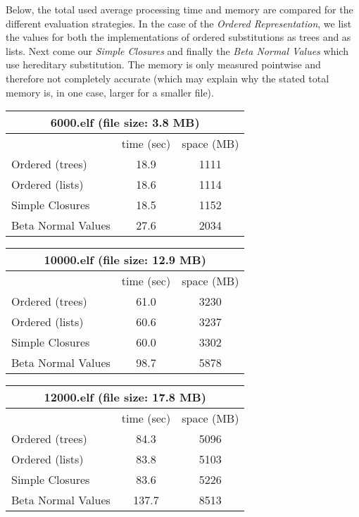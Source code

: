 \documentclass[12pt, a4paper, titlepage]{article}
\begin{document}
Below, the total used average processing time and memory are compared for the different evaluation strategies. In the case of the \emph{Ordered Representation}, we list the values for both the implementations of ordered substitutions as trees and as lists. Next come our \emph{Simple Closures} and finally the \emph{Beta Normal Values} which use hereditary substitution. The memory is only measured pointwise and therefore not completely accurate (which may explain why the stated total memory is, in one case, larger for a smaller file).

\begin{center}

\begin{tabular}{| l || c | c |}
\multicolumn{3}{c}{\textsf{6000.elf} (file size: 3.8 MB)}\\
\hline
& time (sec) & space (MB) \\
\hline
\hline
Ordered (trees) & 18.9 & 1111 \\
\hline
Ordered (lists) & 18.6 & 1114\\
\hline
Simple Closures & 18.5 & 1152\\
\hline
Beta Normal Values & 27.6 & 2034\\
\hline
\end{tabular}

\begin{tabular}{| l || c | c |}
\multicolumn{3}{c}{\textsf{10000.elf} (file size: 12.9 MB)}\\
\hline
& time (sec) & space (MB) \\
\hline
\hline
Ordered (trees) & 61.0 & 3230\\
\hline
Ordered (lists) & 60.6 & 3237\\
\hline
Simple Closures & 60.0 & 3302\\
\hline
Beta Normal Values & 98.7 & 5878\\
\hline
\end{tabular}

\begin{tabular}{| l || c | c |}
\multicolumn{3}{c}{\textsf{12000.elf} (file size: 17.8 MB)}\\
\hline
& time (sec) & space (MB) \\
\hline
\hline
Ordered (trees) & 84.3 & 5096 \\
\hline
Ordered (lists) & 83.8 & 5103 \\
\hline
Simple Closures & 83.6 & 5226 \\
\hline
Beta Normal Values & 137.7 & 8513 \\
\hline
\end{tabular}
\end{center}
\end{document}
